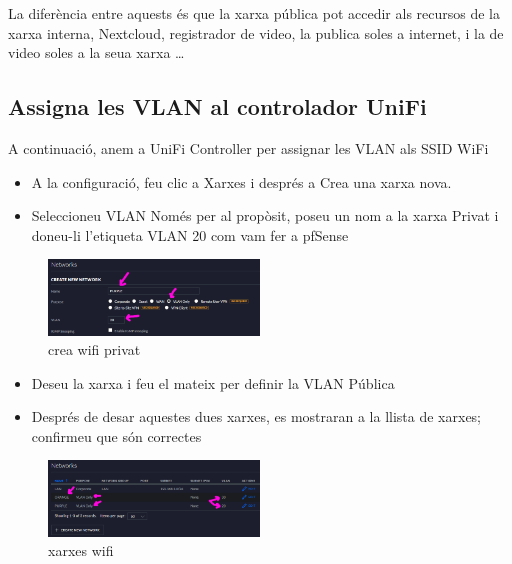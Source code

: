 \documentclass[
  10pt,
]{krantz}
\providecommand{\tightlist}{%
  \setlength{\itemsep}{0pt}\setlength{\parskip}{0pt}}
\begin{document}
La diferència entre aquests és que la xarxa pública pot accedir als recursos de la xarxa interna, Nextcloud, registrador de video, la publica soles a internet, i la de video soles a la seua xarxa \ldots{}

\hypertarget{assigna-les-vlan-al-controlador-unifi}{%
\subsection{Assigna les VLAN al controlador UniFi}\label{assigna-les-vlan-al-controlador-unifi}}

A continuació, anem a UniFi Controller per assignar les VLAN als SSID WiFi

\begin{itemize}
\tightlist
\item
  A la configuració, feu clic a Xarxes i després a Crea una xarxa nova.
\item
  Seleccioneu VLAN Només per al propòsit, poseu un nom a la xarxa Privat i doneu-li l'etiqueta VLAN 20 com vam fer a pfSense
\end{itemize}

\begin{figure}
\centering
\includegraphics[width=0.5\textwidth,height=\textheight]{imatges/wifi/unifi_01_purple_vlan.png}
\caption{crea wifi privat}
\end{figure}

\begin{itemize}
\tightlist
\item
  Deseu la xarxa i feu el mateix per definir la VLAN Pública
\item
  Després de desar aquestes dues xarxes, es mostraran a la llista de xarxes; confirmeu que són correctes
\end{itemize}

\begin{figure}
\centering
\includegraphics[width=0.5\textwidth,height=\textheight]{imatges/wifi/unifi_03_vlans.png}
\caption{xarxes wifi}
\end{figure}
\end{document}

